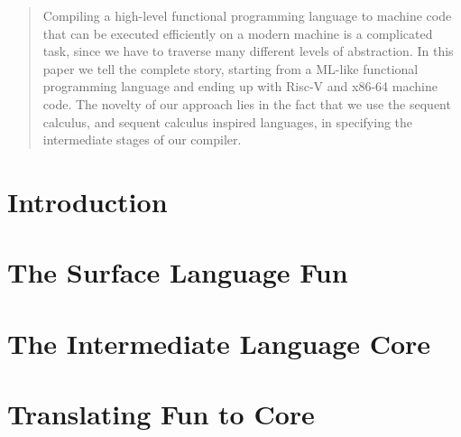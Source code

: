 \documentclass[nonacm]{acmart}
\begin{document}
\author{Jonathan Immanuel Brachthäuser}

\author{Klaus Ostermann}

\begin{abstract}
  Compiling a high-level functional programming language to machine code that can be executed efficiently on a modern machine is a complicated task, since we have to traverse many different levels of abstraction.
  In this paper we tell the complete story, starting from a ML-like functional programming language and ending up with Risc-V and x86-64 machine code.
  The novelty of our approach lies in the fact that we use the sequent calculus, and sequent calculus inspired languages, in specifying the intermediate stages of our compiler.
\end{abstract}

\maketitle

\section{Introduction}
\label{sec:introduction}


\section{The Surface Language Fun}
\label{sec:fun}



\section{The Intermediate Language Core}
\label{sec:core}


\section{Translating Fun to Core}
\label{sec:translation}

\end{document}
